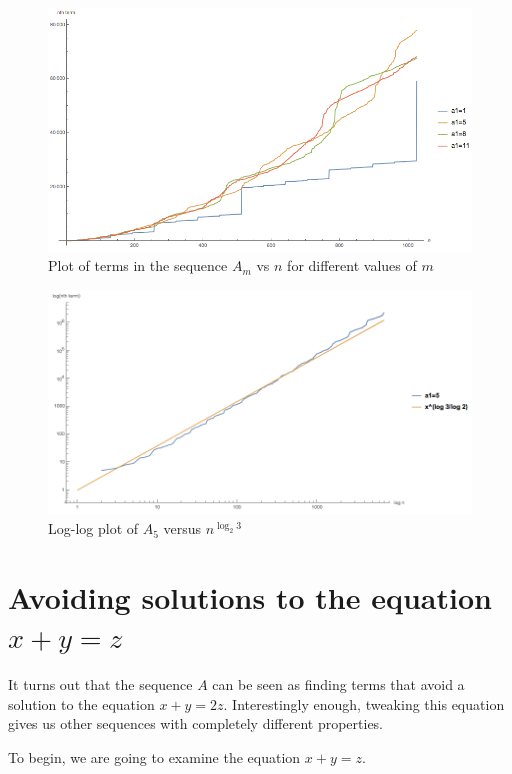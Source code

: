 \documentclass[11pt,letterpaper,twoside,english]{article}
\theoremstyle{theorem}
\theoremstyle{remark}
\begin{document}
\begin{figure}[!h]
  \centering
    \includegraphics[resolution=140]{plot1.png}
    \caption{Plot of terms in the sequence $A_m$ vs $n$ for different values of $m$}
\end{figure}

\vspace{.5in}

\begin{figure}[!h]
  \centering
    \includegraphics[resolution=140]{plot3.png}
    \caption{Log-log plot of $A_5$ versus $n^{\log_2 3}$}
\end{figure}
\newpage\section{Avoiding solutions to the equation $x + y = z$} \label{sec:diffEquation}

It turns out that the sequence $A$ can be seen as finding terms that avoid a solution to the equation $x + y = 2z$. Interestingly enough, tweaking this equation gives us other sequences with completely different properties.

To begin, we are going to examine the equation $x + y = z$.
\end{document}
